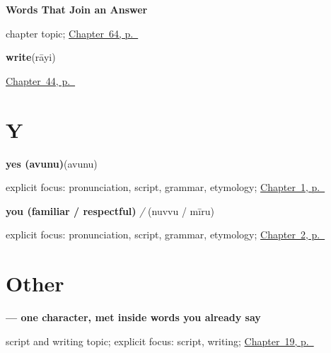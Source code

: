 \noindent\begin{minipage}[t]{\linewidth}
\raggedright
\textbf{Words That Join an Answer}\par
\footnotesize chapter topic; \hyperref[ch:te-joining-words]{Chapter~64, p.~\pageref*{ch:te-joining-words}}
\end{minipage}\par\smallskip

\noindent\begin{minipage}[t]{\linewidth}
\raggedright
\textbf{write}\enspace\emph{}\enspace(rāyi)\par
\footnotesize \hyperref[ch:te-see-say]{Chapter~44, p.~\pageref*{ch:te-see-say}}
\end{minipage}\par\smallskip

\section*{Y}

\noindent\begin{minipage}[t]{\linewidth}
\raggedright
\textbf{yes (avunu)}\enspace\emph{}\enspace(avunu)\par
\footnotesize explicit focus: pronunciation, script, grammar, etymology; \hyperref[ch:greetings]{Chapter~1, p.~\pageref*{ch:greetings}}
\end{minipage}\par\smallskip

\noindent\begin{minipage}[t]{\linewidth}
\raggedright
\textbf{you (familiar / respectful)}\enspace\emph{ / }\enspace(nuvvu / mīru)\par
\footnotesize explicit focus: pronunciation, script, grammar, etymology; \hyperref[ch:introductions]{Chapter~2, p.~\pageref*{ch:introductions}}
\end{minipage}\par\smallskip

\section*{Other}

\noindent\begin{minipage}[t]{\linewidth}
\raggedright
\textbf{ — one character, met inside words you already say}\par
\footnotesize script and writing topic; explicit focus: script, writing; \hyperref[ch:te-asking-age]{Chapter~19, p.~\pageref*{ch:te-asking-age}}
\end{minipage}\par\smallskip

